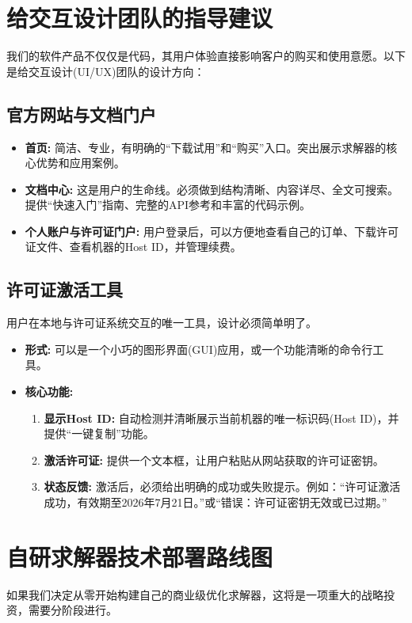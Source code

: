 \documentclass[a4paper, 12pt]{article}
\begin{document}
\section{给交互设计团队的指导建议}
我们的软件产品不仅仅是代码，其用户体验直接影响客户的购买和使用意愿。以下是给交互设计(UI/UX)团队的设计方向：

\subsection{官方网站与文档门户}
\begin{itemize}
    \item \textbf{首页:} 简洁、专业，有明确的“下载试用”和“购买”入口。突出展示求解器的核心优势和应用案例。
    \item \textbf{文档中心:} 这是用户的生命线。必须做到结构清晰、内容详尽、全文可搜索。提供“快速入门”指南、完整的API参考和丰富的代码示例。
    \item \textbf{个人账户与许可证门户:} 用户登录后，可以方便地查看自己的订单、下载许可证文件、查看机器的Host ID，并管理续费。
\end{itemize}

\subsection{许可证激活工具}
用户在本地与许可证系统交互的唯一工具，设计必须简单明了。
\begin{itemize}
    \item \textbf{形式:} 可以是一个小巧的图形界面(GUI)应用，或一个功能清晰的命令行工具。
    \item \textbf{核心功能:}
        \begin{enumerate}
            \item \textbf{显示Host ID:} 自动检测并清晰展示当前机器的唯一标识码(Host ID)，并提供“一键复制”功能。
            \item \textbf{激活许可证:} 提供一个文本框，让用户粘贴从网站获取的许可证密钥。
            \item \textbf{状态反馈:} 激活后，必须给出明确的成功或失败提示。例如：“许可证激活成功，有效期至2026年7月21日。”或“错误：许可证密钥无效或已过期。”
        \end{enumerate}
\end{itemize}

\section{自研求解器技术部署路线图}
如果我们决定从零开始构建自己的商业级优化求解器，这将是一项重大的战略投资，需要分阶段进行。
\end{document}
